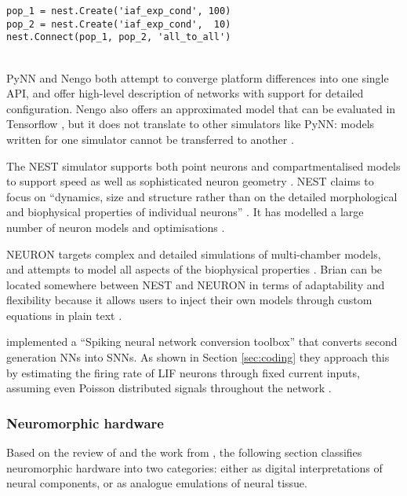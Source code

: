 \documentclass[report.tex]{subfiles}
\begin{document}
\begin{minipage}{\linewidth}
\begin{lstlisting}
pop_1 = nest.Create('iaf_exp_cond', 100)
pop_2 = nest.Create('iaf_exp_cond',  10)
nest.Connect(pop_1, pop_2, 'all_to_all')
\end{lstlisting} 
\end{minipage}
\\[0.3cm]
PyNN and Nengo both attempt to converge platform differences into one single \gls{API}, and
offer high-level description of networks with support for detailed 
configuration.
Nengo also offers an approximated model that can be evaluated in Tensorflow
\cite{Hunsberger2015}, but it does not translate to other simulators like PyNN:
models written for one simulator cannot be transferred to another \cite{Nengo2018}.

The NEST simulator supports both point neurons 
and compartmentalised models to support speed as well as sophisticated neuron
geometry \cite{Gewaltig2007}.
NEST claims to focus on ``dynamics, size and structure rather than on the detailed
morphological and biophysical properties of individual neurons''
\cite{Gewaltig2007}.
It has modelled a large number of neuron models and optimisations
\cite{Blundell2018}.

NEURON targets complex and detailed simulations of multi-chamber models, and
attempts to model all aspects of the biophysical properties \cite{Carnevale2007}.
Brian can be located somewhere between NEST and NEURON in terms of adaptability and flexibility because it allows users to
inject their own models through custom equations in plain text \cite{Goodman2013}.

\textcite{Rueckauer2017} implemented a ``Spiking neural network conversion
toolbox'' that converts second generation \glspl{NN} into \glspl{SNN}.
As shown in Section \ref{sec:coding} they approach this by estimating the 
firing rate of LIF  neurons through fixed current inputs,
assuming even Poisson distributed signals
throughout the network \cite{Rueckauer2017}.

\subsubsection{Neuromorphic hardware} \label{sec:similar-neuromorphic}
Based on the review of \textcite{Walter2015} and the work from
\textcite{Lin2018}, the following section classifies neuromorphic hardware into
two categories: either as digital interpretations of neural components, 
or as analogue emulations of neural tissue.
\end{document}
